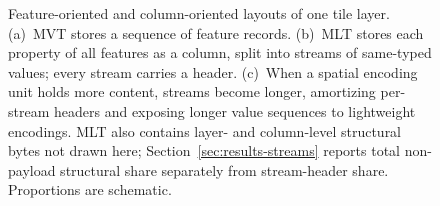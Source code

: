 \begin{figure}[t]
\caption{Feature-oriented and column-oriented layouts of one tile layer.
(a)~MVT stores a sequence of feature records.
(b)~MLT stores each property of all features as a column, split into streams of same-typed values;
every stream carries a header.
(c)~When a spatial encoding unit holds more content, streams become longer, amortizing per-stream
headers and exposing longer value sequences to lightweight encodings. MLT also contains layer- and
column-level structural bytes not drawn here; Section~\ref{sec:results-streams} reports total
non-payload structural share separately from stream-header share. Proportions are schematic.}
\label{fig:mvt-mlt-streams}
\end{figure}